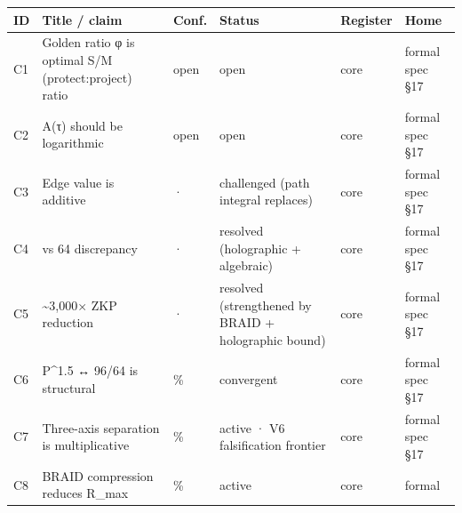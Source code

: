 \documentclass[
]{article}
\newcounter{none} %
\begin{document}
{\def\LTcaptype{none} %
\begin{longtable}[]{@{}
  >{\raggedright\arraybackslash}p{}
  >{\raggedright\arraybackslash}p{}
  >{\raggedright\arraybackslash}p{}
  >{\raggedright\arraybackslash}p{}
  >{\raggedright\arraybackslash}p{}
  >{\raggedright\arraybackslash}p{}@{}}
\toprule\noalign{}
\begin{minipage}[b]{\linewidth}\raggedright
ID
\end{minipage} & \begin{minipage}[b]{\linewidth}\raggedright
Title / claim
\end{minipage} & \begin{minipage}[b]{\linewidth}\raggedright
Conf.
\end{minipage} & \begin{minipage}[b]{\linewidth}\raggedright
Status
\end{minipage} & \begin{minipage}[b]{\linewidth}\raggedright
Register
\end{minipage} & \begin{minipage}[b]{\linewidth}\raggedright
Home
\end{minipage} \\
\midrule\noalign{}
\endhead
\bottomrule\noalign{}
\endlastfoot
C1 & Golden ratio φ is optimal S/M (protect:project) ratio & open & open
& core & formal spec §17 \\
C2 & A(τ) should be logarithmic & open & open & core & formal spec
§17 \\
C3 & Edge value is additive & · & challenged (path integral replaces) &
core & formal spec §17 \\
C4 & 96 vs 64 discrepancy & · & resolved (holographic + algebraic) &
core & formal spec §17 \\
C5 & \textasciitilde3,000× ZKP reduction & · & resolved (strengthened by
BRAID + holographic bound) & core & formal spec §17 \\
C6 & P\^{}1.5 ↔ 96/64 is structural & 35\% & convergent & core & formal
spec §17 \\
C7 & Three-axis separation is multiplicative & 30\% & active · V6
falsification frontier & core & formal spec §17 \\
C8 & BRAID compression reduces R\_max & 45\% & active & core & formal

\end{longtable}}
\end{document}
